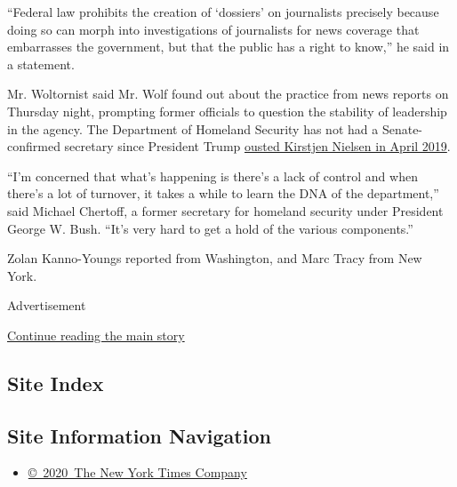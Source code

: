 ``Federal law prohibits the creation of `dossiers' on journalists
precisely because doing so can morph into investigations of journalists
for news coverage that embarrasses the government, but that the public
has a right to know,'' he said in a statement.

Mr. Woltornist said Mr. Wolf found out about the practice from news
reports on Thursday night, prompting former officials to question the
stability of leadership in the agency. The Department of Homeland
Security has not had a Senate-confirmed secretary since President Trump
\href{https://www.nytimes.com/2019/04/07/us/politics/kirstjen-nielsen-dhs-resigns.html}{ousted
Kirstjen Nielsen in April 2019}.

``I'm concerned that what's happening is there's a lack of control and
when there's a lot of turnover, it takes a while to learn the DNA of the
department,'' said Michael Chertoff, a former secretary for homeland
security under President George W. Bush. ``It's very hard to get a hold
of the various components.''

Zolan Kanno-Youngs reported from Washington, and Marc Tracy from New
York.

Advertisement

\protect\hyperlink{after-bottom}{Continue reading the main story}

\hypertarget{site-index}{%
\subsection{Site Index}\label{site-index}}

\hypertarget{site-information-navigation}{%
\subsection{Site Information
Navigation}\label{site-information-navigation}}

\begin{itemize}
\tightlist
\item
  \href{https://help.nytimes.com/hc/en-us/articles/115014792127-Copyright-notice}{©~2020~The
  New York Times Company}
\end{itemize}

